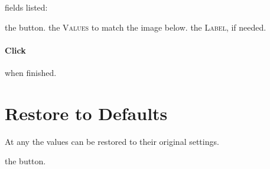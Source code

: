  fields listed:
\begin{description}
     the  button.
     the \textsc{Values} to match the image below.
     the \textsc{Label}, if needed.
\end{description}


\paragraph{Click}  when finished.


\section{Restore to Defaults}

At any the values can be restored to their original settings.

\begin{description}
     the  button.
\end{description}





